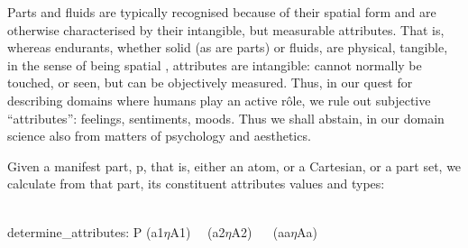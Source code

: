 \label{Attributes}

\begynd
\pind Parts and fluids are typically recognised
\begynd
\pind because of their spatial form and are otherwise characterised by their intangible,
\pind but measurable attributes.
\afslut
\pind That is, whereas endurants, 
\begynd
\pind whether solid (as are parts) or fluids,
\pind are physical, tangible,
\pind in the sense of being spatial 
, 
\pind attributes are intangible: 
\begynd
\pind cannot normally be touched, or seen,  
\pind but can be objectively measured. 
\afslut
\pind Thus, in our quest for describing domains where humans play an
      active r{\^{o}}le, 
\begynd
\pind we rule out subjective ``attributes'':
\pind feelings, sentiments, moods. 
\pind Thus we shall abstain, in our domain science 
\pind also from matters of psychology and aesthetics.
\afslut
\afslut

\label{Functional Analysis of Attributes}

\begynd
\pind Given a manifest part, \textsf{p}, that is,
\begynd
\pind either an atom,
\pind or a Cartesian,
\pind or a part set,
\afslut
\pind we calculate from that part, 
\pind its constituent attributes values and types:
\afslut

\bp
\>\>\\
\>\>\>\>determine\_attributes: P {\RIGHTARROW} (a1{\TIMES}$\eta$A1) {\TIMES}\ \ (a2{\TIMES}$\eta$A2) {\TIMES}\ \ {\DOTDOTDOT} {\TIMES} (aa{\TIMES}$\eta$Aa) 
\ep
\eff
{}


\label{Calculate Attributes}

